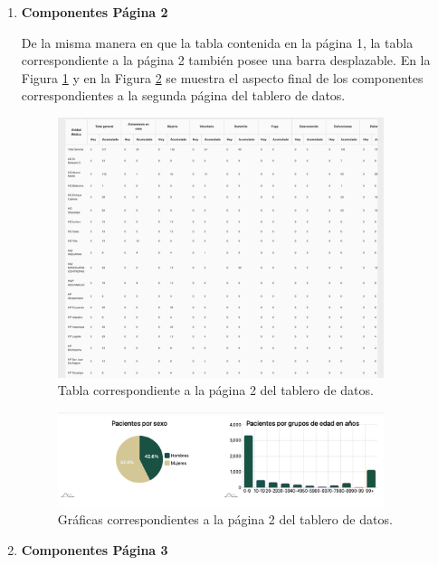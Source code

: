 \begin{enumerate}
    \newpage 
    \item \textbf{Componentes Página 2}

    De la misma manera en que la tabla contenida en la página 1, la tabla correspondiente a la página 2 también posee una barra desplazable. En la Figura \ref{fig:pag2_final_1} y en la Figura \ref{fig:pag2_final_2} se muestra el aspecto final de los componentes correspondientes a la segunda página del tablero de datos.

    \begin{figure}[h!]
        \centering
        \includegraphics[width=0.9\textwidth]{images/pag2_tabla.png}
        \caption{Tabla correspondiente a la página 2 del tablero de datos.}
        \label{fig:pag2_final_1}
    \end{figure}

    \begin{figure}[h!]
        \centering
        \includegraphics[width=0.9\textwidth]{images/pag2_graficas.png}
        \caption{Gráficas correspondientes a la página 2 del tablero de datos.}
        \label{fig:pag2_final_2}
    \end{figure}

    \newpage

    \item \textbf{Componentes Página 3}


\end{enumerate}
